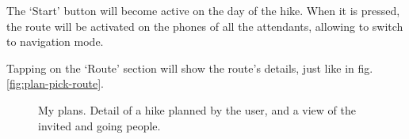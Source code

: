 The `Start' button will become active on the day of the hike.
When it is pressed, the route will be activated on the phones of all the attendants, allowing to switch to navigation mode.

Tapping on the `Route' section will show the route's details, just like in fig.\ref{fig:plan-pick-route}.

\begin{figure}[h!]
    \centering
    \hfill
    \hfill
    \hfill
    \caption{My plans. Detail of a hike planned by the user, and a view of the invited and going people.}
    \label{fig:plan-my-plans}
\end{figure}

